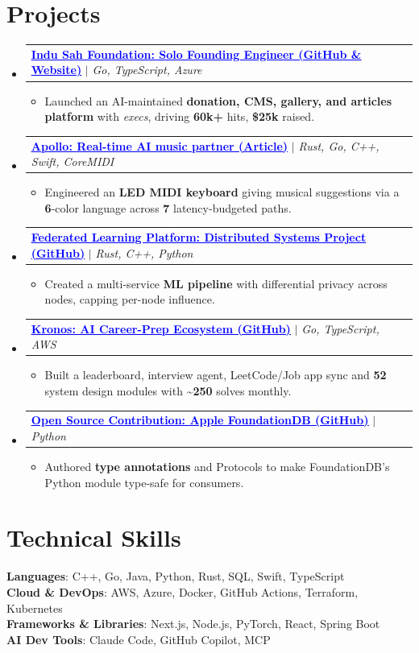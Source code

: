 \documentclass[11pt]{article}
\makeatletter
\newcommand{\resumeItem}[1]{
  \item\small{{#1\vspace{0pt}}}
}
\newcommand{\resumeProjectHeading}[2]{
    \item
    \begin{tabular*}{0.97\textwidth}{l@{\extracolsep{\fill}}r}
      \small#1 & #2 \\
    \end{tabular*}\vspace{-5.5pt}
}
\newcommand{\resumeSubHeadingListStart}{\begin{itemize}[leftmargin=-0in, label={}]}
\newcommand{\resumeSubHeadingListEnd}{\end{itemize}}
\newcommand{\resumeItemListStart}{\begin{itemize}[itemsep=4pt, parsep=0pt, topsep=6pt]}
\newcommand{\resumeItemListEnd}{\end{itemize}\vspace{-5pt}}
\makeatother
\begin{document}
\section{Projects}
  \resumeSubHeadingListStart
  \resumeProjectHeading
    {\textbf{\href{https://github.com/Indu-Sah-Foundation}{\textcolor{blue}{\underline{Indu Sah Foundation: Solo Founding Engineer (GitHub \& Website)}}}} $|$ \emph{Go, TypeScript, Azure}}{}
    \resumeItemListStart
      \resumeItem{Launched an AI-maintained \textbf{donation, CMS, gallery, and articles platform} with \emph{execs}, driving \textbf{60k+} hits, \textbf{\$25k} raised.}
    \resumeItemListEnd
\resumeProjectHeading
  {\textbf{\href{https://medium.com/@rohan.k.sah/apollo-ai-music-collaborator-747705defb29}
  {\textcolor{blue}{\underline{Apollo: Real-time AI music partner (Article)}}}}
  $|$ \emph{Rust, Go, C++, Swift, CoreMIDI}}{}
  \resumeItemListStart
    \resumeItem{Engineered an \textbf{LED MIDI keyboard} giving musical suggestions via a \textbf{6}-color language across \textbf{7} latency-budgeted paths.}
  \resumeItemListEnd
\resumeProjectHeading
  {\textbf{\href{https://github.com/sah-rohan/Federated-Learning-Platform} {\textcolor{blue}{\underline{Federated Learning Platform: Distributed Systems Project (GitHub)}}}}{} $|$ \emph{Rust, C++, Python}}{}
  \resumeItemListStart
    \resumeItem{Created a multi-service \textbf{ML pipeline} with differential privacy across nodes, capping per-node influence.}
  \resumeItemListEnd
\resumeProjectHeading
  {\textbf{\href{https://github.com/sah-rohan/leetcode-dashboard}{\textcolor{blue}{\underline{Kronos: AI Career-Prep Ecosystem (GitHub)}}}} $|$ \emph{Go, TypeScript, AWS}}{}
  \resumeItemListStart
    \resumeItem{Built a leaderboard, interview agent, LeetCode/Job app sync and \textbf{52} system design modules with \textasciitilde{}\textbf{250} solves monthly.}
  \resumeItemListEnd
\resumeProjectHeading
  {\textbf{\href{https://github.com/apple/foundationdb/pull/13241}{\textcolor{blue}{\underline{Open Source Contribution: Apple FoundationDB (GitHub)}}}} $|$ \emph{Python}}{}
  \resumeItemListStart
    \resumeItem{Authored \textbf{type annotations} and Protocols to make FoundationDB's Python module type-safe for consumers.}
  \resumeItemListEnd
  \resumeSubHeadingListEnd
\vspace{-8pt}
\section{Technical Skills}
  \begin{itemize}[leftmargin=0in, label={}, topsep=0pt]
    \small{\item{
      \textbf{Languages}{: C++, Go, Java, Python, Rust, SQL, Swift, TypeScript} \\
      \textbf{Cloud \& DevOps}{: AWS, Azure, Docker, GitHub Actions, Terraform, Kubernetes} \\
      \textbf{Frameworks \& Libraries}{: Next.js, Node.js, PyTorch, React, Spring Boot} \\
      \textbf{AI Dev Tools}{: Claude Code, GitHub Copilot, MCP}
    }}
  \end{itemize}
\end{document}

